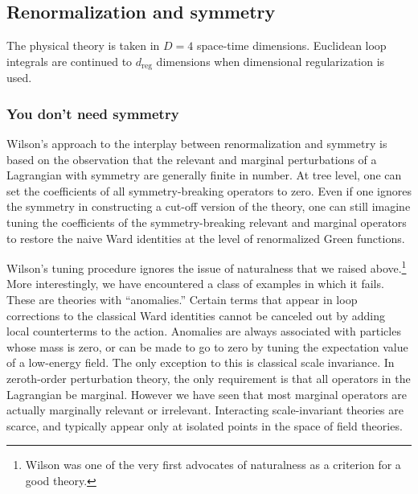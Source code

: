 \subsection{Renormalization and symmetry}

The physical theory is taken in $D=4$ space-time dimensions.  Euclidean loop
integrals are continued to $d_{\mathrm{reg}}$ dimensions when dimensional
regularization is used.

\subsubsection{You don't need symmetry}

Wilson's approach to the interplay between renormalization and symmetry is
based on the observation that the relevant and marginal perturbations of a
Lagrangian with symmetry are generally finite in number. At tree level, one can
set the coefficients of all symmetry-breaking operators to zero. Even if one
ignores the symmetry in constructing a cut-off version of the theory, one can
still imagine tuning the coefficients of the symmetry-breaking relevant and
marginal operators to restore the naive Ward identities at the level of
renormalized Green functions.

Wilson's tuning procedure ignores the issue of naturalness that we raised
above.\footnote[18]{Wilson was one of the very first advocates of naturalness as a
criterion for a good theory.} More interestingly, we have encountered a class
of examples in which it fails. These are theories with ``anomalies.'' Certain
terms that appear in loop corrections to the classical Ward identities cannot
be canceled out by adding local counterterms to the action. Anomalies are
always associated with particles whose mass is zero, or can be made to go to
zero by tuning the expectation value of a low-energy field. The only exception
to this is classical scale invariance. In zeroth-order perturbation theory, the
only requirement is that all operators in the Lagrangian be marginal. However
we have seen that most marginal operators are actually marginally relevant or
irrelevant. Interacting scale-invariant theories are scarce, and typically
appear only at isolated points in the space of field theories.

